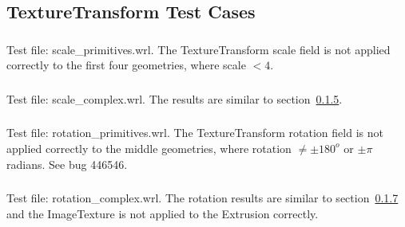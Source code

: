 \subsection{TextureTransform Test Cases}

\subsubsection{\TTA}
\subsubsection{\TTBa\TTBb}
\subsubsection{\TTCa\TTCb}
\subsubsection{\TTDa\TTDb}
\subsubsection{\TTEa\TTEb}
\label{sec:scale}
Test file: scale\_primitives.wrl.\newline
The TextureTransform scale field is not applied correctly to
the first four geometries, where scale $< 4$.

\subsubsection{\TTFa\TTFb}
Test file: scale\_complex.wrl.\newline
The results are similar to section~\ref{sec:scale}.

\subsubsection{\TTGa\TTGb}
\label{sec:rotation}
Test file: rotation\_primitives.wrl.\newline
The TextureTransform rotation field is not applied correctly
to the middle geometries, where rotation $\neq \pm 180^o$ or
$\pm \pi$ radians.
See bug 446546.

\subsubsection{\TTHa\TTHb}
Test file: rotation\_complex.wrl.\newline
The rotation results are similar to section~\ref{sec:rotation} and
the ImageTexture is not applied to the Extrusion correctly.

